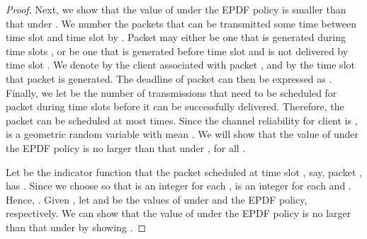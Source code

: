 \documentclass[10pt,nocopyrightspace]{sigplan-proc-varsize-1in}
\begin{document}
\begin{proof}
Next, we show that the value of  under the EPDF policy is smaller than that under . We number the packets that can be transmitted some time between time slot  and time slot  by . Packet  may either be one that is generated during time slots , or be one that is generated before time slot  and is not delivered by time slot . We denote by  the client associated with packet , and by  the time slot that packet  is generated. The deadline of packet  can then be expressed as . Finally, we let  be the number of transmissions that need to be scheduled for packet  during time slots  before it can be successfully delivered. Therefore, the packet  can be scheduled at most  times. Since the channel reliability for client  is ,  is a geometric random variable with mean . We will show that the value of  under the EPDF policy is no larger than that under , for all .

Let  be the indicator function that the packet scheduled at time slot , say, packet , has . Since we choose  so that  is an integer for each ,  is an integer for each  and . Hence, . Given , let  and  be the values of  under  and the EPDF policy, respectively. We can show that the value of  under the EPDF policy is no larger than that under  by showing .


\end{proof}
\end{document}
